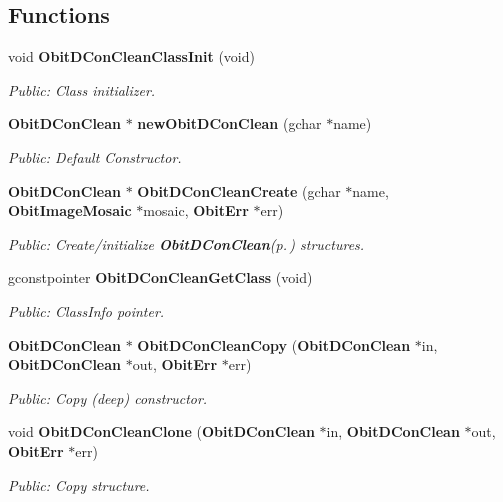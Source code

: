 \subsection*{Functions}
\begin{CompactItemize}
\item 
void {\bf Obit\-DCon\-Clean\-Class\-Init} (void)
\begin{CompactList}\small\item\em Public: Class initializer. \item\end{CompactList}\item 
{\bf Obit\-DCon\-Clean} $\ast$ {\bf new\-Obit\-DCon\-Clean} (gchar $\ast$name)
\begin{CompactList}\small\item\em Public: Default Constructor. \item\end{CompactList}\item 
{\bf Obit\-DCon\-Clean} $\ast$ {\bf Obit\-DCon\-Clean\-Create} (gchar $\ast$name, {\bf Obit\-Image\-Mosaic} $\ast$mosaic, {\bf Obit\-Err} $\ast$err)
\begin{CompactList}\small\item\em Public: Create/initialize {\bf Obit\-DCon\-Clean}{\rm (p.\,\pageref{structObitDConClean})} structures. \item\end{CompactList}\item 
gconstpointer {\bf Obit\-DCon\-Clean\-Get\-Class} (void)
\begin{CompactList}\small\item\em Public: Class\-Info pointer. \item\end{CompactList}\item 
{\bf Obit\-DCon\-Clean} $\ast$ {\bf Obit\-DCon\-Clean\-Copy} ({\bf Obit\-DCon\-Clean} $\ast$in, {\bf Obit\-DCon\-Clean} $\ast$out, {\bf Obit\-Err} $\ast$err)
\begin{CompactList}\small\item\em Public: Copy (deep) constructor. \item\end{CompactList}\item 
void {\bf Obit\-DCon\-Clean\-Clone} ({\bf Obit\-DCon\-Clean} $\ast$in, {\bf Obit\-DCon\-Clean} $\ast$out, {\bf Obit\-Err} $\ast$err)
\begin{CompactList}\small\item\em Public: Copy structure. \item\end{CompactList}\item 

\end{CompactItemize}
